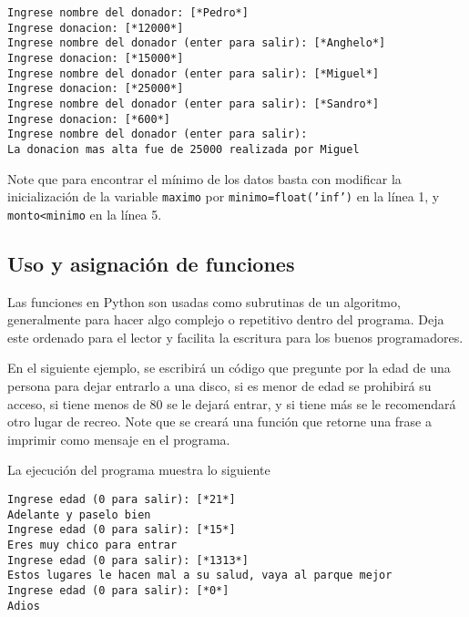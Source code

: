 \begin{lstlisting}[style=consola]
Ingrese nombre del donador: [*Pedro*]
Ingrese donacion: [*12000*]
Ingrese nombre del donador (enter para salir): [*Anghelo*]
Ingrese donacion: [*15000*]
Ingrese nombre del donador (enter para salir): [*Miguel*]
Ingrese donacion: [*25000*]
Ingrese nombre del donador (enter para salir): [*Sandro*]
Ingrese donacion: [*600*]
Ingrese nombre del donador (enter para salir): 
La donacion mas alta fue de 25000 realizada por Miguel
\end{lstlisting}

Note que para encontrar el mínimo de los datos basta con modificar la inicialización de la variable \texttt{maximo} por \texttt{minimo=float('inf')} en la línea 1, y \texttt{monto<minimo} en la línea 5.

\subsection*{Uso y asignación de funciones}
Las funciones en Python son usadas como subrutinas de un algoritmo, generalmente para hacer algo complejo o repetitivo dentro del programa. Deja este ordenado para el lector y facilita la escritura para los buenos programadores.

En el siguiente ejemplo, se escribirá un código que pregunte por la edad de una persona para dejar entrarlo a una disco, si es menor de edad se prohibirá su acceso, si tiene menos de 80 se le dejará entrar, y si tiene más se le recomendará otro lugar de recreo. Note que se creará una función que retorne una frase a imprimir como mensaje en el programa.



La ejecución del programa muestra lo siguiente
\begin{lstlisting}[style=consola]
Ingrese edad (0 para salir): [*21*]
Adelante y paselo bien
Ingrese edad (0 para salir): [*15*]
Eres muy chico para entrar
Ingrese edad (0 para salir): [*1313*]
Estos lugares le hacen mal a su salud, vaya al parque mejor
Ingrese edad (0 para salir): [*0*]
Adios
\end{lstlisting}


